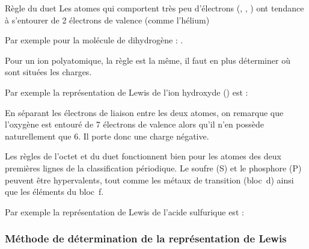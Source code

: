 \documentclass{cours}
\begin{document}
\begin{loi}{Règle du duet}
Les atomes qui comportent très peu d'électrons (, , ) ont tendance à s'entourer de 2 électrons de valence (comme l'hélium)
\end{loi}

Par exemple pour la molécule de dihydrogène : .

Pour un ion polyatomique, la règle est la même, il faut en plus déterminer où sont situées les charges.

Par exemple la représentation de Lewis de l'ion hydroxyde () est :
\begin{center}
\end{center}
En séparant les électrons de liaison entre les deux atomes, on remarque que l'oxygène est entouré de 7 électrons de valence alors qu'il n'en possède naturellement que 6. Il porte donc une charge négative.


Les règles de l'octet et du duet fonctionnent bien pour les atomes des deux premières lignes de la classification périodique. Le soufre (S) et le phosphore (P) peuvent être hypervalents, tout comme les métaux de transition (bloc~d) ainsi que les éléments du bloc~f. 

Par exemple la représentation de Lewis de l'acide sulfurique  est :
\begin{center}
\end{center}

\subsubsection{Méthode de détermination de la représentation de Lewis}%
\label{ssub:méthode_de_détermination_de_la_représentation_de_lewis}
\end{document}

